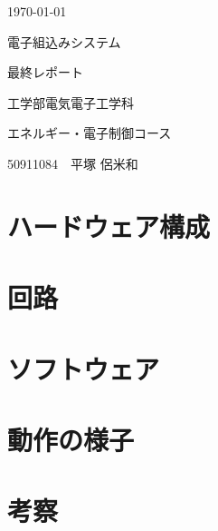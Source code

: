 \documentclass[a4paper,11pt]{jsarticle}
\begin{document}
\begin{titlepage}
  \begin{center}

    {\Large \today}

    \vspace{10truept}

    {\Large 電子組込みシステム}

    \vspace*{180truept}

    {\Huge 最終レポート}

    \vspace{270truept}

    {\Large 工学部電気電子工学科}

    \vspace{10truept}

    {\Large エネルギー・電子制御コース}

    \vspace{30truept}

    {\Large 50911084　平塚 侶米和}

  \end{center}
\end{titlepage}

\tableofcontents







\section{ハードウェア構成}




\section{回路}



\section{ソフトウェア}




\section{動作の様子}





\section{考察}
\end{document}
